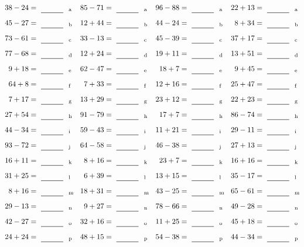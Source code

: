 \documentclass
[
  draft    = true,
  fontsize = 11pt,
  parskip  = half-
]
{scrartcl}
\begin{document}
\clearpage
\begin{align*}
    \pline{38-24}&=\rline{a}
  & \pline{85-71}&=\rline{a}
  & \pline{96-88}&=\rline{a}
  & \pline{22+13}&=\rline{a} \\[1ex]
    \pline{45-27}&=\rline{b}
  & \pline{12+44}&=\rline{b}
  & \pline{44-24}&=\rline{b}
  & \pline{8+34}&=\rline{b} \\[1ex]
    \pline{73-61}&=\rline{c}
  & \pline{33-13}&=\rline{c}
  & \pline{45-39}&=\rline{c}
  & \pline{37+17}&=\rline{c} \\[1ex]
    \pline{77-68}&=\rline{d}
  & \pline{12+24}&=\rline{d}
  & \pline{19+11}&=\rline{d}
  & \pline{13+51}&=\rline{d} \\[1ex]
    \pline{9+18}&=\rline{e}
  & \pline{62-47}&=\rline{e}
  & \pline{18+7}&=\rline{e}
  & \pline{9+45}&=\rline{e} \\[1ex]
    \pline{64+8}&=\rline{f}
  & \pline{7+33}&=\rline{f}
  & \pline{12+16}&=\rline{f}
  & \pline{25+47}&=\rline{f} \\[1ex]
    \pline{7+17}&=\rline{g}
  & \pline{13+29}&=\rline{g}
  & \pline{23+12}&=\rline{g}
  & \pline{22+23}&=\rline{g} \\[1ex]
    \pline{27+54}&=\rline{h}
  & \pline{91-79}&=\rline{h}
  & \pline{17+7}&=\rline{h}
  & \pline{86-74}&=\rline{h} \\[1ex]
    \pline{44-34}&=\rline{i}
  & \pline{59-43}&=\rline{i}
  & \pline{11+21}&=\rline{i}
  & \pline{29-11}&=\rline{i} \\[1ex]
    \pline{93-72}&=\rline{j}
  & \pline{64-58}&=\rline{j}
  & \pline{46-38}&=\rline{j}
  & \pline{27+13}&=\rline{j} \\[1ex]
    \pline{16+11}&=\rline{k}
  & \pline{8+16}&=\rline{k}
  & \pline{23+7}&=\rline{k}
  & \pline{16+16}&=\rline{k} \\[1ex]
    \pline{31+25}&=\rline{l}
  & \pline{6+39}&=\rline{l}
  & \pline{13+15}&=\rline{l}
  & \pline{35-17}&=\rline{l} \\[1ex]
    \pline{8+16}&=\rline{m}
  & \pline{18+31}&=\rline{m}
  & \pline{43-25}&=\rline{m}
  & \pline{65-61}&=\rline{m} \\[1ex]
    \pline{29-13}&=\rline{n}
  & \pline{9+27}&=\rline{n}
  & \pline{78-66}&=\rline{n}
  & \pline{49-28}&=\rline{n} \\[1ex]
    \pline{42-27}&=\rline{o}
  & \pline{32+16}&=\rline{o}
  & \pline{11+25}&=\rline{o}
  & \pline{45+18}&=\rline{o} \\[1ex]
    \pline{24+24}&=\rline{p}
  & \pline{48+15}&=\rline{p}
  & \pline{54-38}&=\rline{p}
  & \pline{44-34}&=\rline{p}
\end{align*}
\end{document}
